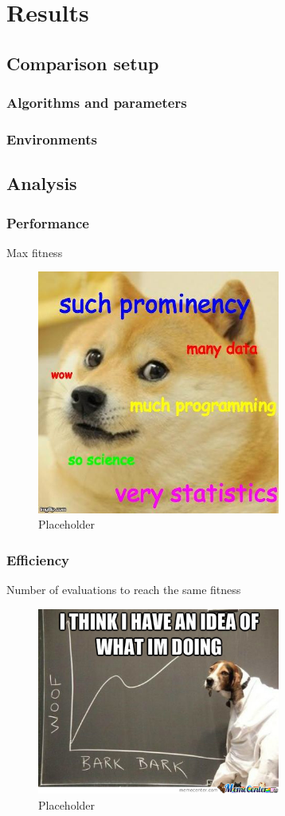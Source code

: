 \chapter{Results}
\label{chap:results}

\section{Comparison setup}
\subsection{Algorithms and parameters}

\subsection{Environments}

\section{Analysis}

\subsection{Performance}
Max fitness
\begin{figure}[H]
\centering
\includegraphics[width=8cm]{images/data_meme.jpg}
\caption{Placeholder}
\end{figure}
      
      
\subsection{Efficiency}
Number of evaluations to reach the same fitness
\begin{figure}[H]
\centering
\includegraphics[width=8cm]{images/data_meme2.jpg}
\caption{Placeholder}
\end{figure}

